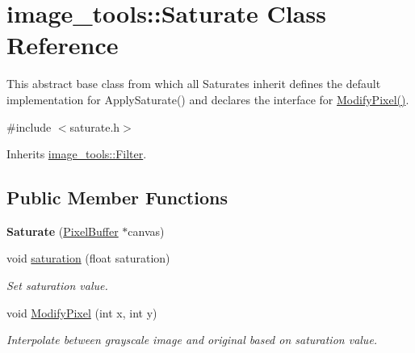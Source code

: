 \hypertarget{classimage__tools_1_1Saturate}{}\section{image\+\_\+tools\+:\+:Saturate Class Reference}
\label{classimage__tools_1_1Saturate}


This abstract base class from which all Saturates inherit defines the default implementation for Apply\+Saturate() and declares the interface for \hyperlink{classimage__tools_1_1Saturate_a6bfeebbbbfb3e52c6981336bfda55640}{Modify\+Pixel()}.  




{\ttfamily \#include $<$saturate.\+h$>$}



Inherits \hyperlink{classimage__tools_1_1Filter}{image\+\_\+tools\+::\+Filter}.

\subsection*{Public Member Functions}
\begin{DoxyCompactItemize}
\item 
{\bfseries Saturate} (\hyperlink{classimage__tools_1_1PixelBuffer}{Pixel\+Buffer} $\ast$canvas)\hypertarget{classimage__tools_1_1Saturate_a6e842bbee50d65afd55380f5e42167e2}{}\label{classimage__tools_1_1Saturate_a6e842bbee50d65afd55380f5e42167e2}

\item 
void \hyperlink{classimage__tools_1_1Saturate_ae932304b1787a8095065f7a3a0a665c3}{saturation} (float saturation)\hypertarget{classimage__tools_1_1Saturate_ae932304b1787a8095065f7a3a0a665c3}{}\label{classimage__tools_1_1Saturate_ae932304b1787a8095065f7a3a0a665c3}

\begin{DoxyCompactList}\small\item\em Set saturation value. \end{DoxyCompactList}\item 
void \hyperlink{classimage__tools_1_1Saturate_a6bfeebbbbfb3e52c6981336bfda55640}{Modify\+Pixel} (int x, int y)\hypertarget{classimage__tools_1_1Saturate_a6bfeebbbbfb3e52c6981336bfda55640}{}\label{classimage__tools_1_1Saturate_a6bfeebbbbfb3e52c6981336bfda55640}

\begin{DoxyCompactList}\small\item\em Interpolate between grayscale image and original based on saturation value. \end{DoxyCompactList}\end{DoxyCompactItemize}
